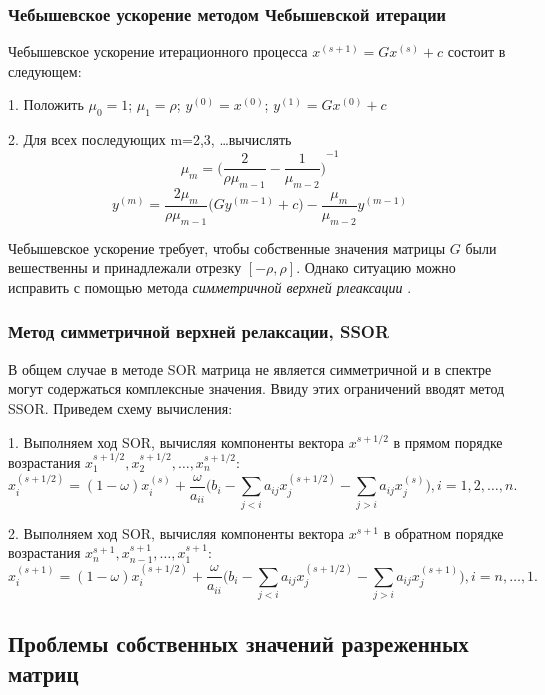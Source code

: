\documentclass[12pt]{article}
\begin{document}
	
	
	
	\bigskip
	{
		\subsubsection{Чебышевское ускорение методом Чебышевской итерации}
	}
	
	Чебышевское ускорение итерационного процесса $x^{(s+1)} = G x^{(s)} + c$ состоит в следующем:
	
	1. Положить $\mu_0 = 1$; $\mu_1 = \rho$; $y^{(0)}=x^{(0)}$; $y^{(1)} = G x^{(0)} + c$
	
	2. Для всех последующих m=2,3, \dots вычислять
	$$\mu_m = {\Big( \frac{2}{\rho \mu_{m-1}} - \frac{1}{\mu_{m-2}} \Big)}^{-1}$$
	$$y^{(m)}= \frac{2 \mu_m}{\rho \mu_{m-1}} \Big( G y^{(m-1)} + c \Big) - \frac{\mu_m}{\mu_{m-2}} y^{(m-1)} $$
	
	Чебышевское ускорение требует, чтобы собственные значения матрицы $G$ были вешественны и принадлежали отрезку $[-\rho, \rho]$. Однако ситуацию можно исправить с помощью  метода {\it симметричной верхней рлеаксации }.




	\bigskip
	{
		\subsubsection{Метод симметричной верхней релаксации, SSOR}
	}
	
	В общем случае в методе SOR матрица не является симметричной и в спектре могут содержаться комплексные значения. Ввиду этих ограничений вводят метод SSOR. Приведем схему вычисления:
	
	1. Выполняем ход SOR, вычисляя компоненты вектора $x^{s+1/2}$ в прямом порядке возрастания $x^{s+1/2}_1, x^{s+1/2}_2, \dots, x^{s+1/2}_n$:
	$$x^{(s+1/2)}_{i} = (1-\omega)x^{(s)}_i + \frac{\omega}{a_{ii}} \Big( b_i - \sum\limits_{j<i} a_{ij} x^{(s+1/2)}_j - \sum\limits_{j>i} a_{ij} x^{(s)}_j \Big), i = 1,2, \dots ,n. $$
	
	2. Выполняем ход SOR, вычисляя компоненты вектора $x^{s+1}$ в обратном порядке возрастания $x^{s+1}_n, x^{s+1}_{n-1}, \dots, x^{s+1}_1$:
	$$x^{(s+1)}_{i} = (1-\omega)x^{(s+1/2)}_i + \frac{\omega}{a_{ii}} \Big( b_i - \sum\limits_{j<i} a_{ij} x^{(s+1/2)}_j - \sum\limits_{j>i} a_{ij} x^{(s+1)}_j \Big), i = n, \dots ,1. $$
	
	\bigskip
	
	{
		\subsection{Проблемы собственных значений разреженных матриц}
	}
	
\end{document}
